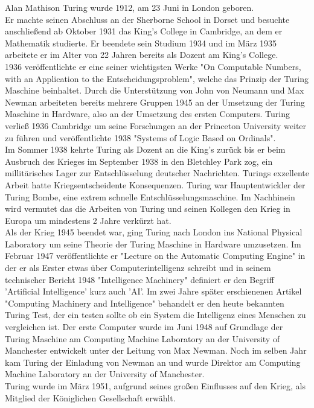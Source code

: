 Alan Mathison Turing wurde 1912, am 23 Juni in London geboren.\\
Er machte seinen Abschluss an der Sherborne School in Dorset und besuchte anschließend ab Oktober 1931 das King's College in Cambridge, an dem er Mathematik studierte. Er beendete sein Studium 1934 und im März 1935 arbeitete er im Alter von 22 Jahren bereits als Dozent am King's College.\\
1936 veröffentlichte er eine seiner wichtigsten Werke "On Computable Numbers, with an Application to the Entscheidungsproblem", welche das Prinzip der Turing Maschine beinhaltet. Durch die Unterstützung von John von Neumann und Max Newman arbeiteten bereits mehrere Gruppen 1945 an der Umsetzung der Turing Maschine in Hardware, also an der Umsetzung des ersten Computers. Turing verließ 1936 Cambridge um seine Forschungen an der Princeton University weiter zu führen und veröffentlichte 1938 "Systems of Logic Based on Ordinals".\\ 
Im Sommer 1938 kehrte Turing als Dozent an die King's zurück bis er beim Ausbruch des Krieges im September 1938 in den Bletchley Park zog, ein millitärisches Lager zur Entschlüsselung deutscher Nachrichten. Turings exzellente Arbeit hatte Kriegsentscheidente Konsequenzen. Turing war Hauptentwickler der Turing Bombe, eine extrem schnelle Entschlüsselungsmaschine. Im Nachhinein wird vermutet das die Arbeiten von Turing und seinen Kollegen den Krieg in Europa um mindestens 2 Jahre verkürzt hat.\\
Als der Krieg 1945 beendet war, ging Turing nach London ins National Physical Laboratory um seine Theorie der Turing Maschine in Hardware umzusetzen. Im Februar 1947 veröffentlichte er "Lecture on the Automatic Computing Engine" in der er als Erster etwas über Computerintelligenz schreibt und in seinem technischer Bericht 1948 "Intelligence Machinery" definiert er den Begriff 'Artificial Intelligence' kurz auch 'AI'. Im zwei Jahre später erschienenen Artikel "Computing Machinery and Intelligence" behandelt er den heute bekannten Turing Test, der ein testen sollte ob ein System die Intelligenz eines Menschen zu vergleichen ist.
Der erste Computer wurde im Juni 1948 auf Grundlage der Turing Maschine am Computing Machine Laboratory an der University of Manchester entwickelt unter der Leitung von Max Newman. Noch im selben Jahr kam Turing der Einladung von Newman an und wurde Direktor am Computing Machine Laboratory an der University of Manchester.\\
Turing wurde im März 1951, aufgrund seines großen Einflusses auf den Krieg, als Mitglied der Königlichen Gesellschaft erwählt.
